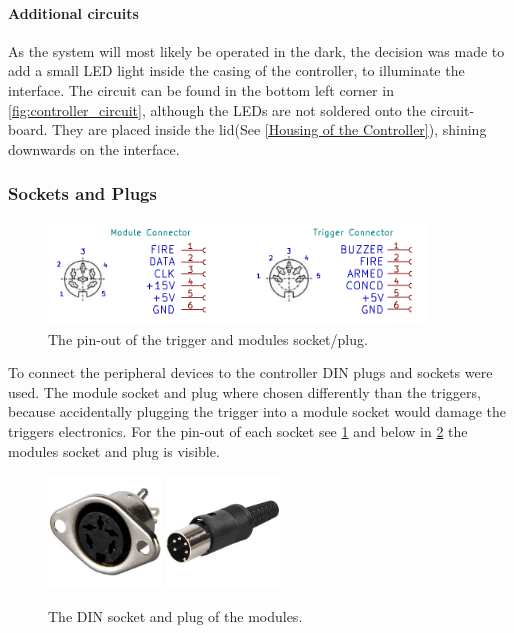 \paragraph{Additional circuits}
As the system will most likely be operated in the dark, the decision was made to add a small LED light inside the casing of the controller, to illuminate the interface. The circuit can be found in the bottom left corner in \cref{fig:controller_circuit}, although the LEDs are not soldered onto the circuit-board. They are placed inside the lid(See \cref{Housing of the Controller}), shining downwards on the interface.

\subsubsection{Sockets and Plugs}
\label{Sockets and Plugs}

\begin{figure}[!ht]
    \centering
    \includegraphics[width=10cm]{./Figures/mod_trig_connector.png}
    \caption{The pin-out of the trigger and modules socket/plug.   }
    \label{fig:mod_trig_connector}     
\end{figure}



\noindent To connect the peripheral devices to the controller DIN plugs and sockets were used. The module socket and plug where chosen differently than the triggers, because accidentally plugging the trigger into a module socket would damage the triggers electronics. For the pin-out of each socket see \cref{fig:mod_trig_connector} and below in \cref{fig:din_plug_socket} the modules socket and plug is visible.

\begin{figure}[!ht]
    \centering
    \includegraphics[width=3cm]{./Figures/MAB_5.jpg}
    \hspace{2cm}
    \includegraphics[width=3cm]{./Figures/MAS_50.jpg}
    \caption{The DIN socket and plug of the modules.}
    \label{fig:din_plug_socket}     
\end{figure}

